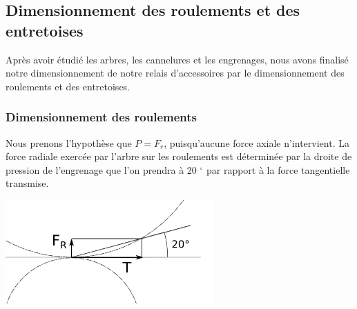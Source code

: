 \documentclass{config}
\begin{document}
\begin{spacing}{1.2}
\begin{table}[h]
\centering
{}
\end{table}


\newpage
\subsection{Dimensionnement des roulements et des entretoises}

Après avoir étudié les arbres, les cannelures et les engrenages, nous avons finalisé notre dimensionnement de notre relais d'accessoires par le dimensionnement des roulements et des entretoises.

\subsubsection{Dimensionnement des roulements}

Nous prenons l'hypothèse que $P = F_r$, puisqu'aucune force axiale n'intervient.
La force radiale exercée par l'arbre sur les roulements est déterminée par la droite de pression de l'engrenage que l'on prendra à 20 $^\circ{}$ par rapport à la force tangentielle transmise.

\begin{center}
\includegraphics[width=0.6\textwidth]{Droite_de_pression.png}
\end{center}


\end{spacing}
\end{document}
